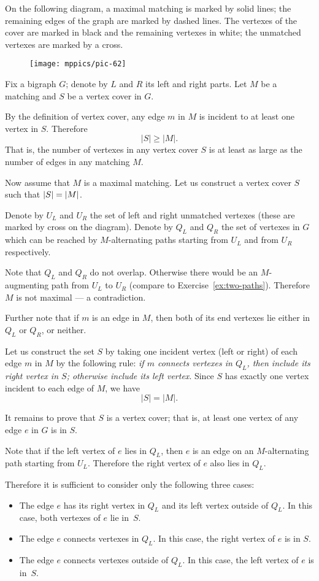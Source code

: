 On the following diagram, a maximal matching is marked by solid lines;
the remaining edges of the graph are marked by dashed lines.
The vertexes of the cover are marked in black and the remaining vertexes in white;
the unmatched vertexes are marked by a cross.

\begin{wrapfigure}{o}{30 mm}
\vskip-5mm
\centering
\texttt{[image: mppics/pic-62]}
\vskip1mm
\end{wrapfigure}

Fix a bigraph $G$;
denote by $L$ and $R$ its left and right parts.
Let $M$ be a matching and $S$ be a vertex cover in $G$.

By the definition of vertex cover, any edge $m$ in $M$ is incident to at least one vertex in $S$.
Therefore 
\[|S|\ge |M|.\] 
That is, the number of vertexes in any vertex cover $S$ is at least as large as the number of edges in any matching $M$.

Now assume that $M$ is a maximal matching.
Let us construct a vertex cover $S$ such that $|S|\z=|M|$.

Denote by $U_L$ and $U_R$ the set of left and right unmatched vertexes (these are marked by cross on the diagram).
Denote by $Q_L$ and $Q_R$ the set of vertexes in $G$ which can be reached by $M$-alternating paths starting from $U_L$ and from $U_R$ respectively.

Note that $Q_L$ and $Q_R$ do not overlap.
Otherwise there would be an $M$-augmenting path from $U_L$ to $U_R$ (compare to Exercise~\ref{ex:two-paths}).
Therefore $M$ is not maximal --- a contradiction.

Further note that if $m$ is an edge in $M$, then both of its end vertexes lie either in $Q_L$ or $Q_R$, or neither.

Let us construct the set $S$ by taking one incident vertex (left or right) of each edge $m$ in $M$ by the following rule:
\emph{if $m$ connects vertexes in $Q_L$, then include its right vertex in $S$;
otherwise include its left vertex}.
Since $S$ has exactly one vertex incident to each edge of $M$, we have
\[|S|=|M|.\]

It remains to prove that $S$ is a vertex cover;
that is, at least one vertex of any edge $e$ in $G$ is in $S$.

Note that if the left vertex of $e$ lies in $Q_L$, then $e$ is an edge on an $M$-alternating path starting from $U_L$. 
Therefore the right vertex of $e$ also lies in $Q_L$.

Therefore it is sufficient to consider only the following three cases:
\begin{itemize}
\item The edge $e$ has
its right vertex in $Q_L$ and its left vertex outside of $Q_L$.
In this case, both vertexes of $e$ lie in~$S$.
\item The edge $e$ connects vertexes in $Q_L$.
In this case, the right vertex of $e$ is in $S$.
\item The edge $e$ connects vertexes outside of $Q_L$. 
In this case, the left vertex of $e$ is in~$S$.
\qeds
\end{itemize}


